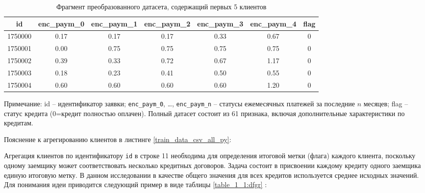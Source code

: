 \begin{table}[H]
\centering
\caption{Фрагмент преобразованного датасета, содержащий первых 5 клиентов}
\label{df_fragment}
\begin{tabular}{|c|c|c|c|c|c|c|}
  \hline
  \rowcolor[gray]{.9}
   id & enc\_paym\_0 & enc\_paym\_1 & enc\_paym\_2 & enc\_paym\_3 & enc\_paym\_4 & flag \\
  \hline
  1750000 & 0.17 & 0.17 & 0.17 & 0.33 & 0.67 & 0 \\ \hline
  1750001 & 0.00 & 0.75 & 0.75 & 0.75 & 0.75 & 0 \\ \hline
  1750002 & 0.39 & 0.33 & 0.72 & 0.67 & 1.17 & 0 \\ \hline
  1750003 & 0.18 & 0.23 & 0.41 & 0.50 & 0.55 & 0 \\ \hline
  1750004 & 0.60 & 0.60 & 0.60 & 0.60 & 1.20 & 0 \\ \hline
\end{tabular}

\vspace{3mm} 

\begin{minipage}{0.98\textwidth}
  \fontsize{9}{11}\selectfont
  \justifying
Примечание: id -- идентификатор заявки; \texttt{enc\_paym\_0}, \dots, \texttt{enc\_paym\_n} -- статусы ежемесячных платежей за последние $n$ месяцев; flag -- статус кредита (0=кредит полностью оплачен). Полный датасет состоит из 61 признака, включая дополнительные характеристики по кредитам.
\end{minipage}
\end{table}
        
{\co Пояснение к агрегированию клиентов в листинге \ref{train_data_csv_all_py}:}    
     
        Агрегация клиентов по идентификатору \texttt{id} в строке 11 необходима для определения итоговой метки (флага) каждого клиента, поскольку одному заемщику может соответствовать несколько кредитных договоров. Задача состоит в присвоении каждому кредиту одного заемщика единую итоговую метку. В данном исследовании в качестве общего значения для всех кредитов используется среднее исходных значений. Для понимания идеи приводится следующий пример в виде таблицы  \ref{table_1_1:dfgr} :
        
